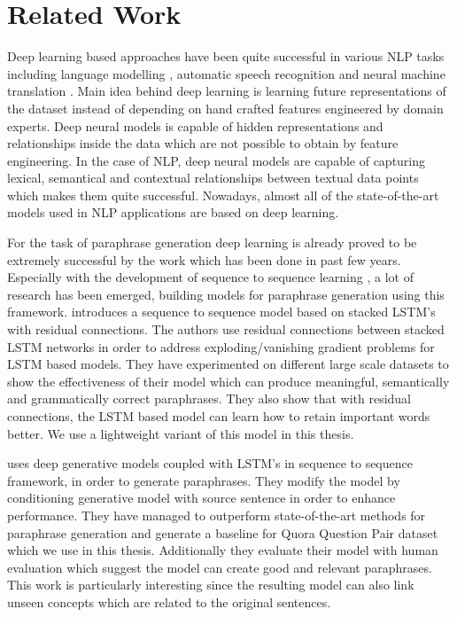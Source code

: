 \section{Related Work}

Deep learning based approaches have been quite successful in various NLP tasks including language modelling \cite{siriam}, automatic speech recognition \cite{hannun} and neural machine translation \cite{cho}. Main idea behind deep learning is learning future representations of the dataset instead of depending on hand crafted features engineered by domain experts. Deep neural models is capable of hidden representations and relationships inside the data which are not possible to obtain by feature engineering. In the case of NLP, deep neural models are capable of capturing lexical, semantical and contextual relationships between textual data points which makes them quite successful. Nowadays, almost all of the state-of-the-art models used in NLP applications are based on deep learning.

For the task of paraphrase generation deep learning is already proved to be extremely successful by the work which has been done in past few years. Especially with the development of sequence to sequence learning \cite{Vinyalsetal}, a lot of research has been emerged, building models for paraphrase generation using this framework. \cite{Prakashetal} introduces a sequence to sequence model based on stacked LSTM's with residual connections. The authors use residual connections between stacked LSTM networks in order to address exploding/vanishing gradient problems for LSTM based models. They have experimented on different large scale datasets to show the effectiveness of their model which can produce meaningful, semantically and grammatically correct paraphrases. They also show that with residual connections, the LSTM based model can learn how to retain important words better. We use a lightweight variant of this model in this thesis.

\cite{Guptaetal} uses deep generative models coupled with LSTM's in sequence to sequence framework, in order to generate paraphrases. They modify the model by conditioning generative model with source sentence in order to enhance performance. They have managed to outperform state-of-the-art methods for paraphrase generation and generate a baseline for Quora Question Pair dataset which we use in this thesis. Additionally they evaluate their model with human evaluation which suggest the model can create good and relevant paraphrases. This work is particularly interesting since the resulting model can also link unseen concepts which are related to the original sentences.

